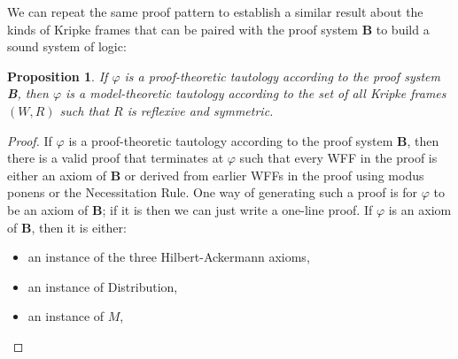 \documentclass[11pt]{article}
\newtheorem{proposition}[theorem]{Proposition}
\theoremstyle{definition}
\theoremstyle{remark}
\begin{document}
We can repeat the same proof pattern to establish a similar result about the kinds of Kripke frames that can be paired with the proof system $\textbf{B}$ to build a sound system of logic:
\begin{proposition}
    If $\varphi$ is a proof-theoretic tautology according to the proof system \textbf{B}, then $\varphi$ is a model-theoretic tautology according to the set of all Kripke frames $(W,R)$ such that $R$ is reflexive and symmetric.
\end{proposition}
\begin{proof}
    If $\varphi$ is a proof-theoretic tautology according to the proof system \textbf{B}, then there is a valid proof that terminates at $\varphi$ such that every WFF in the proof is either an axiom of \textbf{B} or derived from earlier WFFs in the proof using modus ponens or the Necessitation Rule. One way of generating such a proof is for $\varphi$ to be an axiom of \textbf{B}; if it is then we can just write a one-line proof. If $\varphi$ is an axiom of \textbf{B}, then it is either:
    \begin{itemize}
    \item an instance of the three Hilbert-Ackermann axioms,
    
    \item an instance of Distribution, 
    
    \item an instance of $M$,


\end{itemize}
\end{proof}
\end{document}
